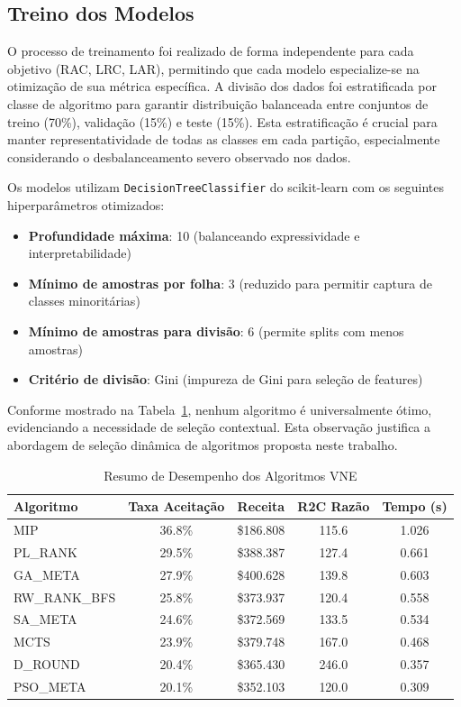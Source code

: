 \documentclass[conference]{IEEEtran}
\begin{document}
\subsection{Treino dos Modelos}

O processo de treinamento foi realizado de forma independente para cada objetivo (RAC, LRC, LAR), permitindo que cada modelo especialize-se na otimização de sua métrica específica. A divisão dos dados foi estratificada por classe de algoritmo para garantir distribuição balanceada entre conjuntos de treino (70\%), validação (15\%) e teste (15\%). Esta estratificação é crucial para manter representatividade de todas as classes em cada partição, especialmente considerando o desbalanceamento severo observado nos dados.

Os modelos utilizam \texttt{DecisionTreeClassifier} do scikit-learn com os seguintes hiperparâmetros otimizados:

\begin{itemize}
    \item \textbf{Profundidade máxima}: 10 (balanceando expressividade e interpretabilidade)
    \item \textbf{Mínimo de amostras por folha}: 3 (reduzido para permitir captura de classes minoritárias)
    \item \textbf{Mínimo de amostras para divisão}: 6 (permite splits com menos amostras)
    \item \textbf{Critério de divisão}: Gini (impureza de Gini para seleção de features)
\end{itemize}

Conforme mostrado na Tabela~\ref{tab:algorithm-summary}, nenhum algoritmo é universalmente ótimo, evidenciando a necessidade de seleção contextual. Esta observação justifica a abordagem de seleção dinâmica de algoritmos proposta neste trabalho.

\begin{table}[H]
\centering
\caption{Resumo de Desempenho dos Algoritmos VNE}
\label{tab:algorithm-summary}
\begin{tabular}{lcccc}
\toprule
\textbf{Algoritmo} & \textbf{Taxa Aceitação} & \textbf{Receita} & \textbf{R2C Razão} & \textbf{Tempo (s)} \\
\midrule
MIP & 36.8\% & \$186.808 & 115.6 & 1.026 \\
PL\_RANK & 29.5\% & \$388.387 & 127.4 & 0.661 \\
GA\_META & 27.9\% & \$400.628 & 139.8 & 0.603 \\
RW\_RANK\_BFS & 25.8\% & \$373.937 & 120.4 & 0.558 \\
SA\_META & 24.6\% & \$372.569 & 133.5 & 0.534 \\
MCTS & 23.9\% & \$379.748 & 167.0 & 0.468 \\
D\_ROUND & 20.4\% & \$365.430 & 246.0 & 0.357 \\
PSO\_META & 20.1\% & \$352.103 & 120.0 & 0.309 \\
\bottomrule
\end{tabular}
\end{table}
\end{document}
